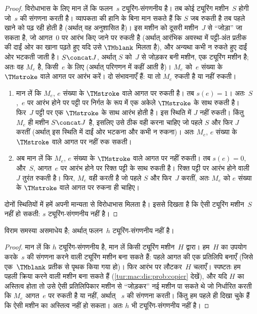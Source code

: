 \documentclass[../../../include/open-logic-section]{subfiles}
\begin{document}
\begin{proof}
विरोधाभास के लिए मान लें कि फलन~$s$ ट्यूरिंग-संगणनीय है। तब कोई
ट्यूरिंग मशीन~$S$ होगी जो~$s$ की संगणना करती है। व्यापकता की हानि के बिना
मान सकते हैं कि $S$ जब रुकती है तब पहले खाने को पढ़ रही होती है
(अर्थात् वह अनुशासित है)। इस मशीन को दूसरी मशीन~$J$ से ``जोड़ा'' जा
सकता है, जो आगत~$0$ पर आरंभ किए जाने पर रुकती है (अर्थात् आरंभिक अवस्था
में पट्टी-अंत प्रतीक की दाईं ओर का खाना पढ़ते हुए यदि उसे $\TMblank$
मिलता है), और अन्यथा कभी न रुकते हुए दाईं ओर भटकती जाती है।
$S \concat J$, अर्थात् $S$ को~$J$ से जोड़कर बनी मशीन, एक ट्यूरिंग मशीन
है; अतः वह $M_e$ है, किसी~$e$ के लिए (अर्थात् परिगणन में कहीं आती है)।
$M_e$ को~$e$ संख्या
के $\TMstroke$ वाले आगत पर आरंभ करें। दो संभावनाएँ हैं: या तो $M_e$
रुकती है या नहीं रुकती।
\begin{enumerate}
\item मान लें कि $M_e$, $e$ संख्या के $\TMstroke$ वाले आगत पर रुकती
  है। तब $s(e)
  = 1$। अतः~$S$,~$e$ पर आरंभ होने पर पट्टी पर निर्गत के
  रूप में एक अकेले $\TMstroke$ के साथ रुकती है। फिर~$J$ पट्टी पर एक
  $\TMstroke$ के साथ आरंभ होती है। इस स्थिति में $J$ नहीं रुकती। किंतु
  $M_e$ ही मशीन $S
  \concat J$ है, इसलिए उसे ठीक वही करना चाहिए जो पहले
  $S$ और फिर $J$ करतीं (अर्थात् इस स्थिति में दाईं ओर भटकना और कभी न
  रुकना)। अतः $M_e$, $e$ संख्या के $\TMstroke$ वाले आगत पर नहीं रुक सकती।

\item अब मान लें कि $M_e$, $e$ संख्या के $\TMstroke$ वाले आगत पर नहीं
  रुकती। तब $s(e) = 0$, और~$S$, आगत~$e$ पर आरंभ होने पर रिक्त पट्टी के
  साथ रुकती है। रिक्त पट्टी पर आरंभ होने वाली~$J$ तुरंत रुकती है। फिर,
  $M_e$ वही करती है जो पहले $S$ और फिर~$J$ करतीं, अतः $M_e$ को $e$
  संख्या के $\TMstroke$ वाले आगत पर रुकना ही चाहिए।
\end{enumerate}
दोनों स्थितियों में हमें अपनी मान्यता से विरोधाभास मिलता है। इससे
दिखता है कि ऐसी ट्यूरिंग मशीन~$S$ नहीं हो सकती: $s$ ट्यूरिंग-संगणनीय
नहीं है।
\end{proof}

\begin{thm}
 विराम समस्या असमाधेय है; अर्थात् फलन~$h$
ट्यूरिंग-संगणनीय नहीं है।
\end{thm}

\begin{proof}
मान लें कि $h$ ट्यूरिंग-संगणनीय है, मान लें किसी ट्यूरिंग मशीन~$H$ द्वारा।
हम~$H$ का उपयोग करके~$s$ की संगणना करने वाली ट्यूरिंग मशीन बना सकते हैं:
पहले आगत की एक प्रतिलिपि बनाएँ (जिसे एक~$\TMblank$ प्रतीक से पृथक किया
गया हो)। फिर आरंभ पर लौटकर~$H$ चलाएँ। स्पष्टतः हम पहली क्रिया करने वाली
मशीन बना सकते हैं (\cref{tur:mac:dis:prob:copier} देखें), और यदि $H$
का अस्तित्व होता तो उसे ऐसी प्रतिलिपिकार मशीन से ``जोड़कर'' नई मशीन पा
सकते थे जो निर्धारित करती कि $M_e$ आगत~$e$ पर रुकती है या नहीं, अर्थात्
~$s$ की संगणना करती। किंतु हम पहले ही दिखा चुके हैं कि ऐसी मशीन का
अस्तित्व नहीं हो सकता। अतः $h$ भी ट्यूरिंग-संगणनीय नहीं है।
\end{proof}
\end{document}
